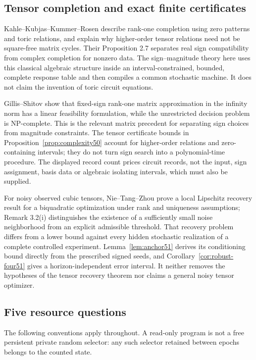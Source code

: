 \subsection{Tensor completion and exact finite certificates}
Kahle--Kubjas--Kummer--Rosen \cite[Proposition 2.2 and Remarks 2.3,
2.5]{KKKR17} describe rank-one completion using zero patterns and toric
relations, and explain why higher-order tensor relations need not be
square-free matrix cycles. Their Proposition 2.7 separates real sign
compatibility from complex completion for nonzero data. The
sign--magnitude theory here uses this classical algebraic structure
inside an interval-constrained, bounded, complete response table and
then compiles a common stochastic machine. It does not claim the
invention of toric circuit equations.

Gillis--Shitov \cite[Lemma 1 and Theorem 3]{GS19} show that fixed-sign
rank-one matrix approximation in the infinity norm has a linear
feasibility formulation, while the unrestricted decision problem is
NP-complete. This is the relevant matrix precedent for separating
sign choices from magnitude constraints. The tensor certificate
bounds in Proposition~\ref{prop:complexity50} account for higher-order
relations and zero-containing intervals; they do not turn sign
search into a polynomial-time procedure. The displayed record count
prices circuit records, not the input, sign assignment, basis data or
algebraic isolating intervals, which must also be supplied.

For noisy observed cubic tensors, Nie--Tang--Zhou
\cite[Theorem 3.1]{NTZ26} prove a local Lipschitz recovery result for
a biquadratic optimization under rank and uniqueness assumptions;
Remark 3.2(i) distinguishes the existence of a sufficiently small
noise neighborhood from an explicit admissible threshold. That
recovery problem differs from a lower bound against every hidden
stochastic realization of a complete controlled experiment.
Lemma~\ref{lem:anchor51} derives its conditioning bound directly
from the prescribed signed seeds, and
Corollary~\ref{cor:robust-four51} gives a horizon-independent error
interval. It neither removes the hypotheses of the tensor recovery
theorem nor claims a general noisy tensor optimizer.

\subsection{Five resource questions}
The following conventions apply throughout. A read-only program is
not a free persistent private random selector: any such selector
retained between epochs belongs to the counted state.

